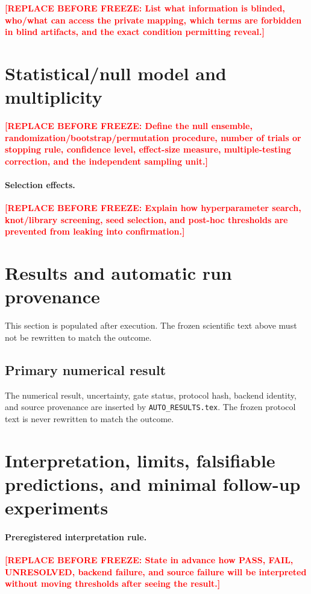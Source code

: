 \documentclass[11pt,a4paper]{article}
\newcommand{\SSTTODO}[1]{\ifmmode\text{\color{red}\bfseries TODO}\else\textcolor{red}{\textbf{[REPLACE BEFORE FREEZE: #1]}}\fi}
\begin{document}
\SSTTODO{List what information is blinded, who/what can access the private mapping, which terms are forbidden in blind artifacts, and the exact condition permitting reveal.}

\section{Statistical/null model and multiplicity}
\SSTTODO{Define the null ensemble, randomization/bootstrap/permutation procedure, number of trials or stopping rule, confidence level, effect-size measure, multiple-testing correction, and the independent sampling unit.}

\paragraph{Selection effects.}
\SSTTODO{Explain how hyperparameter search, knot/library screening, seed selection, and post-hoc thresholds are prevented from leaking into confirmation.}

\section{Results and automatic run provenance}
This section is populated after execution. The frozen scientific text above must not be rewritten to match the outcome.

\subsection{Primary numerical result}
The numerical result, uncertainty, gate status, protocol hash, backend identity, and source provenance are inserted by \texttt{AUTO\_RESULTS.tex}. The frozen protocol text is never rewritten to match the outcome.

\section{Interpretation, limits, falsifiable predictions, and minimal follow-up experiments}
\paragraph{Preregistered interpretation rule.}
\SSTTODO{State in advance how PASS, FAIL, UNRESOLVED, backend failure, and source failure will be interpreted without moving thresholds after seeing the result.}
\end{document}
